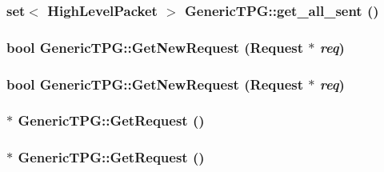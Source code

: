 \hypertarget{classGenericTPG_2b424dd4b2f5aa07a0231d69d5790470}{
\subsubsection[{get\_\-all\_\-sent}]{\setlength{\rightskip}{0pt plus 5cm}set$<$ {\bf HighLevelPacket} $>$ GenericTPG::get\_\-all\_\-sent ()}}
\label{classGenericTPG_2b424dd4b2f5aa07a0231d69d5790470}


\hypertarget{classGenericTPG_e0d0461b59107eb3b4facb4d29ada948}{
\subsubsection[{GetNewRequest}]{\setlength{\rightskip}{0pt plus 5cm}bool GenericTPG::GetNewRequest ({\bf Request} $\ast$ {\em req})}}
\label{classGenericTPG_e0d0461b59107eb3b4facb4d29ada948}


\hypertarget{classGenericTPG_e0d0461b59107eb3b4facb4d29ada948}{
\subsubsection[{GetNewRequest}]{\setlength{\rightskip}{0pt plus 5cm}bool GenericTPG::GetNewRequest ({\bf Request} $\ast$ {\em req})}}
\label{classGenericTPG_e0d0461b59107eb3b4facb4d29ada948}


\hypertarget{classGenericTPG_2e30905e10685209af2c6ff15bb4f07a}{
\subsubsection[{GetRequest}]{$\ast$ GenericTPG::GetRequest ()}}
\label{classGenericTPG_2e30905e10685209af2c6ff15bb4f07a}


\hypertarget{classGenericTPG_ec1a1105fdd72ac3ba86ab577c1f5226}{
\subsubsection[{GetRequest}]{ $\ast$ GenericTPG::GetRequest ()}}
\label{classGenericTPG_ec1a1105fdd72ac3ba86ab577c1f5226}


